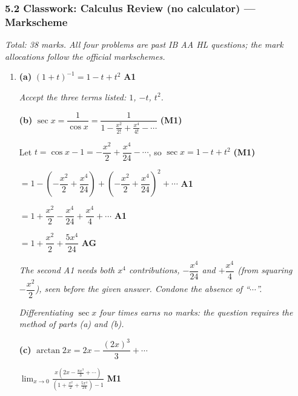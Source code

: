 \documentclass[12pt, twoside]{article}
\begin{document}
\subsubsection*{5.2 Classwork: Calculus Review (no calculator) --- Markscheme}

\emph{Total: 38 marks. All four problems are past IB AA HL questions; the
mark allocations follow the official markschemes.}

\begin{enumerate}[itemsep=0.3cm]

\item[1.] 

\textbf{(a)} $(1 + t)^{-1} = 1 - t + t^{2}$ \hfill \textbf{A1}

\emph{Accept the three terms listed: $1$, $-t$, $t^{2}$.}

\medskip

\textbf{(b)} $\sec x = \dfrac{1}{\cos x}
= \dfrac{1}{1 - \frac{x^{2}}{2!} + \frac{x^{4}}{4!} - \cdots}$
\hfill \textbf{(M1)}

Let $t = \cos x - 1 = -\dfrac{x^{2}}{2} + \dfrac{x^{4}}{24} - \cdots$, so
$\sec x = 1 - t + t^{2}$ \hfill \textbf{(M1)}

$= 1 - \left(-\dfrac{x^{2}}{2} + \dfrac{x^{4}}{24}\right)
+ \left(-\dfrac{x^{2}}{2} + \dfrac{x^{4}}{24}\right)^{2} + \cdots$
\hfill \textbf{A1}

$= 1 + \dfrac{x^{2}}{2} - \dfrac{x^{4}}{24} + \dfrac{x^{4}}{4} + \cdots$
\hfill \textbf{A1}

$= 1 + \dfrac{x^{2}}{2} + \dfrac{5x^{4}}{24}$ \hfill \textbf{AG}

\emph{The second A1 needs both $x^{4}$ contributions, $-\dfrac{x^{4}}{24}$
and $+\dfrac{x^{4}}{4}$ (from squaring $-\dfrac{x^{2}}{2}$), seen before the
given answer. Condone the absence of ``$\cdots$''.}

\emph{Differentiating $\sec x$ four times earns no marks: the question
requires the method of parts (a) and (b).}

\medskip

\textbf{(c)} $\arctan 2x = 2x - \dfrac{(2x)^{3}}{3} + \cdots$

$\displaystyle\lim_{x \to 0}\frac{x\left(2x - \frac{8x^{3}}{3} + \cdots\right)}
{\left(1 + \frac{x^{2}}{2} + \frac{5x^{4}}{24}\right) - 1}$
\hfill \textbf{M1}


\end{enumerate}
\end{document}
